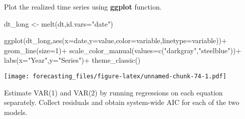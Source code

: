 \documentclass[
  oneside]{book}
\newenvironment{Shaded}{\begin{snugshade}}{\end{snugshade}}
\newcommand{\AttributeTok}[1]{\textcolor[rgb]{0.77,0.63,0.00}{#1}}
\newcommand{\DecValTok}[1]{\textcolor[rgb]{0.00,0.00,0.81}{#1}}
\newcommand{\FunctionTok}[1]{\textcolor[rgb]{0.00,0.00,0.00}{#1}}
\newcommand{\NormalTok}[1]{#1}
\newcommand{\OtherTok}[1]{\textcolor[rgb]{0.56,0.35,0.01}{#1}}
\newcommand{\SpecialCharTok}[1]{\textcolor[rgb]{0.00,0.00,0.00}{#1}}
\newcommand{\StringTok}[1]{\textcolor[rgb]{0.31,0.60,0.02}{#1}}
\begin{document}
Plot the realized time series using \textbf{ggplot} function.

\begin{Shaded}
\begin{Highlighting}[]
\NormalTok{dt\_long }\OtherTok{\textless{}{-}} \FunctionTok{melt}\NormalTok{(dt,}\AttributeTok{id.vars=}\StringTok{"date"}\NormalTok{)}

\FunctionTok{ggplot}\NormalTok{(dt\_long,}\FunctionTok{aes}\NormalTok{(}\AttributeTok{x=}\NormalTok{date,}\AttributeTok{y=}\NormalTok{value,}\AttributeTok{color=}\NormalTok{variable,}\AttributeTok{linetype=}\NormalTok{variable))}\SpecialCharTok{+}
  \FunctionTok{geom\_line}\NormalTok{(}\AttributeTok{size=}\DecValTok{1}\NormalTok{)}\SpecialCharTok{+}
  \FunctionTok{scale\_color\_manual}\NormalTok{(}\AttributeTok{values=}\FunctionTok{c}\NormalTok{(}\StringTok{"darkgray"}\NormalTok{,}\StringTok{"steelblue"}\NormalTok{))}\SpecialCharTok{+}
  \FunctionTok{labs}\NormalTok{(}\AttributeTok{x=}\StringTok{"Year"}\NormalTok{,}\AttributeTok{y=}\StringTok{"Series"}\NormalTok{)}\SpecialCharTok{+}
  \FunctionTok{theme\_classic}\NormalTok{()}
\end{Highlighting}
\end{Shaded}

\texttt{[image: forecasting\_files/figure-latex/unnamed-chunk-74-1.pdf]}

Estimate VAR(1) and VAR(2) by running regressions on each equation separately. Collect residuals and obtain system-wide AIC for each of the two models.
\end{document}

